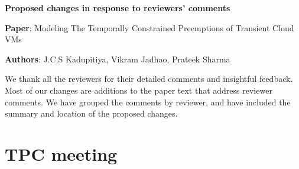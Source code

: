 \documentclass{article}
\begin{document}
\begin{center}
  \large{\textbf {Proposed changes in response to reviewers'
      comments}}

{\textbf{Paper}:  Modeling The Temporally Constrained Preemptions of Transient Cloud VMs}

{\textbf{Authors}: J.C.S Kadupitiya, Vikram Jadhao, Prateek Sharma}
\end{center}

\date{April 15 2020}

We thank all the reviewers for their detailed comments and insightful feedback.
Most of our changes are additions to the paper text that address reviewer comments. 
We have grouped the comments by reviewer, and have included the summary and location of the proposed changes.



\section{TPC meeting}
\end{document}
